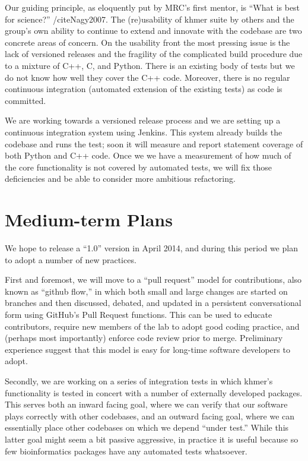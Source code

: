 \documentclass[11pt]{article}
\begin{document}
Our guiding principle, as eloquently put by MRC's first mentor, is
``What is best for science?'' /cite{Nagy2007}. The (re)usability of
khmer suite by others and the group's own ability to continue to
extend and innovate with the codebase are two concrete areas of
concern. On the usability front the most pressing issue is the
lack of versioned releases and the fragility of the complicated build
procedure due to a mixture of C++, C, and Python.  There is an
existing body of tests but we do not know how well they cover the C++
code.  Moreover, there is no regular continuous integration (automated
extension of the existing tests) as code is committed.

We are working towards a versioned release process and we are setting
up a continuous integration system using Jenkins.  This system already
builds the codebase and runs the test; soon it will measure and report
statement coverage of both Python and C++ code.  Once we we have a
measurement of how much of the core functionality is not covered by
automated tests, we will fix those deficiencies and be able to consider
more ambitious refactoring.

\section{Medium-term Plans}

We hope to release a ``1.0'' version in April 2014, and during this period
we plan to adopt a number of new practices.

First and foremost, we will move to a ``pull request'' model for
contributions, also known as ``github flow,'' in which both small and
large changes are started on branches and then discussed, debated, and
updated in a persistent conversational form using GitHub's Pull
Request functions.  This can be used to educate contributors, require
new members of the lab to adopt good coding practice, and (perhaps
most importantly) enforce code review prior to merge.  Preliminary
experience suggest that this model is easy for long-time software
developers to adopt.

Secondly, we are working on a series of integration tests in which
khmer's functionality is tested in concert with a number of externally
developed packages.  This serves both an inward facing goal, where we
can verify that our software plays correctly with other codebases, and
an outward facing goal, where we can essentially place other codebases
on which we depend ``under test.''  While this latter goal might seem
a bit passive aggressive, in practice it is useful because so few
bioinformatics packages have any automated tests whatsoever.  
\end{document}
